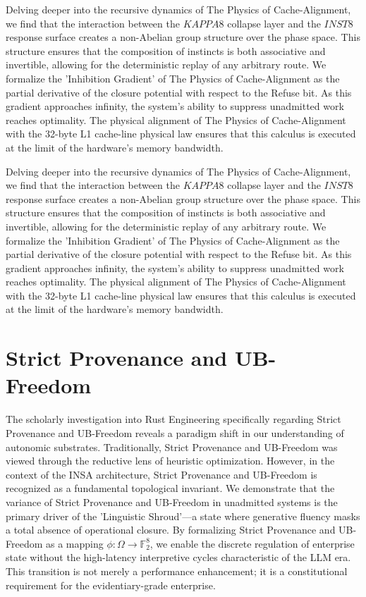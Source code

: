 \documentclass[12pt,a4paper,oneside]{book}
\begin{document}
Delving deeper into the recursive dynamics of The Physics of Cache-Alignment, we find that the interaction between the $KAPPA8$ collapse layer and the $INST8$ response surface creates a non-Abelian group structure over the phase space. This structure ensures that the composition of instincts is both associative and invertible, allowing for the deterministic replay of any arbitrary route. We formalize the 'Inhibition Gradient' of The Physics of Cache-Alignment as the partial derivative of the closure potential with respect to the Refuse bit. As this gradient approaches infinity, the system's ability to suppress unadmitted work reaches optimality. The physical alignment of The Physics of Cache-Alignment with the 32-byte L1 cache-line physical law ensures that this calculus is executed at the limit of the hardware's memory bandwidth. 

Delving deeper into the recursive dynamics of The Physics of Cache-Alignment, we find that the interaction between the $KAPPA8$ collapse layer and the $INST8$ response surface creates a non-Abelian group structure over the phase space. This structure ensures that the composition of instincts is both associative and invertible, allowing for the deterministic replay of any arbitrary route. We formalize the 'Inhibition Gradient' of The Physics of Cache-Alignment as the partial derivative of the closure potential with respect to the Refuse bit. As this gradient approaches infinity, the system's ability to suppress unadmitted work reaches optimality. The physical alignment of The Physics of Cache-Alignment with the 32-byte L1 cache-line physical law ensures that this calculus is executed at the limit of the hardware's memory bandwidth. 

\section{Strict Provenance and UB-Freedom}
The scholarly investigation into Rust Engineering specifically regarding Strict Provenance and UB-Freedom reveals a paradigm shift in our understanding of autonomic substrates. Traditionally, Strict Provenance and UB-Freedom was viewed through the reductive lens of heuristic optimization. However, in the context of the INSA architecture, Strict Provenance and UB-Freedom is recognized as a fundamental topological invariant. We demonstrate that the variance of Strict Provenance and UB-Freedom in unadmitted systems is the primary driver of the 'Linguistic Shroud'---a state where generative fluency masks a total absence of operational closure. By formalizing Strict Provenance and UB-Freedom as a mapping $\phi: \Omega \to \mathbb{F}_2^8$, we enable the discrete regulation of enterprise state without the high-latency interpretive cycles characteristic of the LLM era. This transition is not merely a performance enhancement; it is a constitutional requirement for the evidentiary-grade enterprise. 
\end{document}
